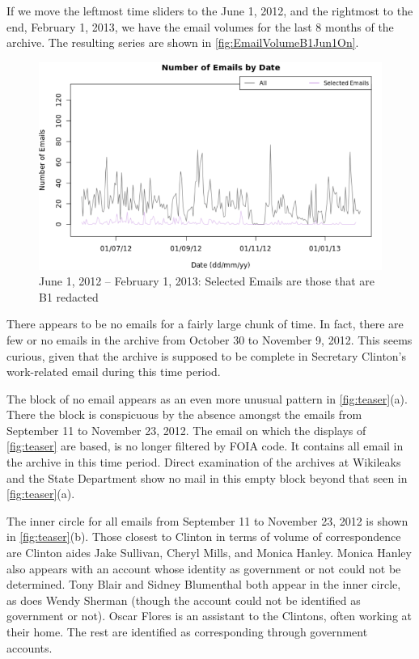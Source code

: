 \documentclass[journal]{vgtc}                %
\begin{document}
If we move the leftmost time sliders to the June 1, 2012, and the rightmost to the end, February 1, 2013, we have the email volumes for the last 8 months of the archive.  The resulting series are shown in \autoref{fig:EmailVolumeB1Jun1On}.
\begin{figure}[h]
\begin{center}
\includegraphics[width=0.95\linewidth]{EmailVolumeB1Jun1On}
\caption{June 1, 2012 -- February 1, 2013:  Selected Emails are those that are B1 redacted}
\label{fig:EmailVolumeB1Jun1On}
\end{center}
\end{figure}
There appears to be no emails for a fairly large chunk of time.  In fact, there are few or no emails in the archive from October 30 to November 9, 2012.  
This seems curious, given that the archive is supposed to be complete in Secretary Clinton's work-related email during this time period.  

The block of no email appears as an even more unusual pattern in \autoref{fig:teaser}(a).  There the block is conspicuous by the absence amongst the emails from September 11 to November 23, 2012.  The email on which the displays of \autoref{fig:teaser} are based, is no longer filtered by FOIA code.  It contains all email in the archive in this time period.  Direct examination of the archives at Wikileaks and the State Department show no mail in this empty block beyond that seen in \autoref{fig:teaser}(a).

The inner circle for all emails from September 11 to November 23, 2012 is shown in \autoref{fig:teaser}(b).  Those closest to Clinton in terms of volume of correspondence are Clinton aides Jake Sullivan, Cheryl Mills, and Monica Hanley.  Monica Hanley also appears with an account whose identity as government or not could not be determined.  Tony Blair and Sidney Blumenthal both appear in the inner circle, as does Wendy Sherman (though the account could not be identified as government or not).  Oscar Flores is an assistant to the Clintons, often working at their home.  The rest are identified as corresponding through government accounts.
\end{document}

